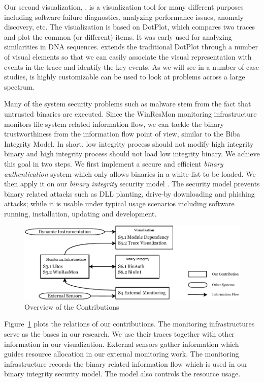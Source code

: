 Our second visualization,  \cite{wu2010visualizing},
is a visualization tool for many different purposes including
software failure diagnostics,
analyzing performance issues, anomaly discovery, etc.
The visualization is based on DotPlot, which compares two traces
and plot the common (or different) items.
It was early used for
analyzing similarities in DNA sequences.
 extends the traditional DotPlot through a number of visual elements
so that we can easily associate the visual representation with events in the
trace and identify the key events.
As we will see in a number of case studies,
 is highly customizable can be used to look at problems
across a large spectrum.

Many of the system security problems such as malware stem from the fact that
untrusted binaries are executed.
Since the WinResMon monitoring infrastructure monitors file system related information flow,
we can tackle the binary trustworthiness from the information
flow point of view, similar to the Biba Integrity Model.
In short, low integrity process should not modify high integrity binary and
high integrity process should not load low integrity binary.
We achieve this goal in two steps.
We first implement a secure and efficient {\em binary authentication} system
\cite{halim2008lightweight,wu2009esi}
which only allows binaries in a white-list to be loaded.
We then apply it on our {\em binary integrity} security model
\cite{wu2010pub,wu2011towards}.
The security model prevents binary related attacks such as DLL planting,
drive-by downloading and phishing attacks;
while it is usable under typical usage scenarios including
software running, installation, updating and development.

\begin{figure}[htb]
\centering
\includegraphics[width=1.0\textwidth]{overview.pdf}
\caption{Overview of the Contributions}
\label{fig:overview}
\end{figure}

Figure~\ref{fig:overview} plots the relations of our contributions.
The monitoring infrastructures serve as the bases in our research.
We use their traces together with other information in our visualization.
External sensors gather information which guides resource allocation
in our external monitoring work.
The monitoring infrastructure records the binary related information flow
which is used in our binary integrity security model.
The model also controls the resource usage.

